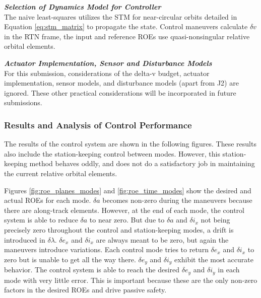 

\textbf{\textit{Selection of Dynamics Model for Controller}} \\
The naive least-squares utilizes the STM for near-circular orbits detailed in Equation \ref{eq:stm_matrix} to propagate the state. Control maneuvers calculate $\delta v$ in the RTN frame, the input and reference ROEs use quasi-nonsingular relative orbital elements.

\textbf{\textit{Actuator Implementation, Sensor and Disturbance Models}} \\
For this submission, considerations of the delta-v budget, actuator implementation, sensor models, and disturbance models (apart from J2) are ignored. These other practical considerations will be incorporated in future submissions.

\subsubsection{Results and Analysis of Control Performance} \label{sec:analysis_of_control}

The results of the control system are shown in the following figures. These results also include the station-keeping control between modes. However, this station-keeping method behaves oddly, and does not do a satisfactory job in maintaining the current relative orbital elements.

Figures \ref{fig:roe_planes_modes} and \ref{fig:roe_time_modes} show the desired and actual ROEs for each mode. $\delta a$ becomes non-zero during the maneuvers because there are along-track elements. However, at the end of each mode, the control system is able to reduce $\delta a$ to near zero. But due to $\delta a$ and $\delta i_x$ not being precisely zero throughout the control and station-keeping modes, a drift is introduced in $\delta \lambda$. $\delta e_x$ and $\delta i_x$ are always meant to be zero, but again the maneuvers introduce variations. Each control mode tries to return $\delta e_x$ and $\delta i_x$ to zero but is unable to get all the way there. $\delta e_y$ and $\delta i_y$ exhibit the most accurate behavior. The control system is able to reach the desired $\delta e_y$ and $\delta i_y$ in each mode with very little error. This is important because these are the only non-zero factors in the desired ROEs and drive passive safety. 

